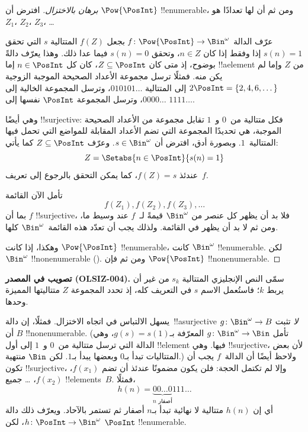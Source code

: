 \documentclass[../../../include/open-logic-section]{subfiles}
\begin{document}
\begin{proof}[برهان {} بالاختزال]
افترض أن $\Pow{\PosInt}$ !!{enumerable}، ومن ثم أن لها تعدادًا هو
$Z_{1}$، $Z_{2}$، $Z_{3}$، \dots

عرّف الدالة $f \colon \Pow{\PosInt} \to \Bin^\omega$ بجعل
$f(Z)$ المتتالية $s$ التي تحقق $s(n) = 1$ إذا وفقط إذا كان
$n \in Z$، وتحقق $s(n) = 0$ فيما عدا ذلك. وهذا يعرّف دالةً بوضوح،
إذ متى كان $Z \subseteq \PosInt$، كان كل $n \in \PosInt$ إما
!!a{element} من $Z$ وإما لم يكن منه. فمثلًا ترسل مجموعة الأعداد
الصحيحة الموجبة الزوجية $2\PosInt = \{2,
4, 6, \dots\}$ إلى المتتالية $010101\dots$، وترسل المجموعة الخالية
إلى $0000\dots$، وترسل المجموعة $\PosInt$ نفسها إلى $1111\dots$.

وهي أيضًا !!{surjective}: فكل متتالية من~$0$ و~$1$ تقابل مجموعة من
الأعداد الصحيحة الموجبة، هي تحديدًا المجموعة التي تضم الأعداد المقابلة
للمواضع التي تحمل فيها المتتالية~$1$. وبصورة أدق، افترض أن
$s \in \Bin^\omega$. وعرّف $Z
\subseteq \PosInt$ كما يأتي:
\[
Z = \Setabs{n \in \PosInt}{s(n) = 1}
\]
عندئذ $f(Z) = s$، كما يمكن التحقق بالرجوع إلى تعريف~$f$.

تأمل الآن القائمة
\[
f(Z_1), f(Z_2), f(Z_3), \dots
\]
بما أن $f$ !!{surjective}، فلا بد أن يظهر كل عنصر من $\Bin^\omega$
قيمةً لـ~$f$ عند وسيط ما، ومن ثم لا بد أن يظهر في القائمة. ولذلك يجب
أن تعدّد هذه القائمة~$\Bin^\omega$ كلها.

وهكذا، إذا كانت $\Pow{\PosInt}$ !!{enumerable}، كانت $\Bin^\omega$
!!{enumerable}. لكن $\Bin^\omega$ !!{nonenumerable}
(). ومن ثم فإن $\Pow{\PosInt}$
!!{nonenumerable}.
\end{proof}

\begin{editorial}
\textbf{تصويب في المصدر (OLSIZ-004).}
سمّى النص الإنجليزي المتتالية $s_k$ من غير أن يربط $k$؛ فاستُعمل الاسم
$s$ في التعريف كله، إذ تحدد المجموعة $Z$ متتاليتها المميزة وحدها.
\end{editorial}

\begin{explain}
يسهل الالتباس في اتجاه الاختزال. فمثلًا، إن دالة~!!a{surjective}
$g \colon \Bin^\omega \to B$ \emph{لا} تثبت أن $B$ !!{nonenumerable}. (تأمل $g
\colon \Bin^\omega \to \Bin$ المعرّفة بـ$g(s) = s(1)$، وهي الدالة
التي ترسل متتالية من~$0$ و~$1$ إلى أول !!{element} فيها. وهي
!!{surjective}، لأن بعض المتتاليات تبدأ بـ$0$ وبعضها يبدأ بـ$1$.
لكن $\Bin$ منتهية.) ولاحظ أيضًا أن الدالة~$f$ يجب أن تكون
!!{surjective}، وإلا لم تكتمل الحجة: فلن يكون مضمونًا عندئذ أن تضم
$f(x_1)$، $f(x_2)$، \dots{} جميع !!{element}s~$B$. فمثلًا،
\[
h(n) = \underbrace{00\dots0}_{\text{$n$ أصفار}}111\dots
\]
أي إن $h(n)$ متتالية لا نهائية تبدأ بـ$n$ أصفار ثم تستمر بالآحاد.
ويعرّف ذلك دالة $h\colon \PosInt \to \Bin^\omega$، لكن
$\PosInt$ !!{enumerable}.
\end{explain}
\end{document}
